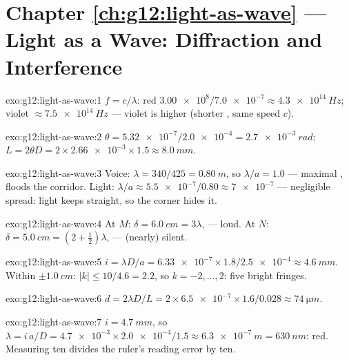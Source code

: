 \section*{Chapter \ref{ch:g12:light-as-wave} --- Light as a Wave: Diffraction and Interference}

\begin{solution}{exo:g12:light-as-wave:1}
$f = c/\lambda$: red $\num{3.00e8}/\num{7.0e-7} \approx
\qty{4.3e14}{Hz}$; violet $\approx \qty{7.5e14}{Hz}$ --- violet is
higher (shorter , same speed $c$).
\end{solution}

\begin{solution}{exo:g12:light-as-wave:2}
$\theta = \num{5.32e-7}/\num{2.0e-4} = \qty{2.7e-3}{rad}$;
$L = 2\theta D = 2 \times \num{2.66e-3} \times 1.5 \approx
\qty{8.0}{mm}$.
\end{solution}

\begin{solution}{exo:g12:light-as-wave:3}
Voice: $\lambda = 340/425 = \qty{0.80}{m}$, so $\lambda/a = 1.0$ ---
maximal ,  floods the corridor. Light:
$\lambda/a \approx \num{5.5e-7}/0.80 \approx \num{7e-7}$ ---
negligible spread: light keeps straight, so the corner hides it.
\end{solution}

\begin{solution}{exo:g12:light-as-wave:4}
At $M$: $\delta = \qty{6.0}{cm} = 3\lambda$,  --- loud.
At $N$: $\delta = \qty{5.0}{cm} = (2 + \tfrac12)\lambda$, 
--- (nearly) silent.
\end{solution}

\begin{solution}{exo:g12:light-as-wave:5}
$i = \lambda D/a = \num{6.33e-7} \times 1.8/\num{2.5e-4} \approx
\qty{4.6}{mm}$. Within $\pm\qty{1.0}{cm}$: $|k| \leq 10/4.6 = 2.2$,
so $k = -2, \dots, 2$: five bright fringes.
\end{solution}

\begin{solution}{exo:g12:light-as-wave:6}
$d = 2\lambda D/L = 2 \times \num{6.5e-7} \times 1.6/0.028 \approx
\qty{74}{\micro m}$.
\end{solution}

\begin{solution}{exo:g12:light-as-wave:7}
$i = \qty{4.7}{mm}$, so $\lambda = i\,a/D = \num{4.7e-3} \times
\num{2.0e-4}/1.5 \approx \qty{6.3e-7}{m} = \qty{630}{nm}$: red.
Measuring ten  divides the ruler's reading error by ten.
\end{solution}

